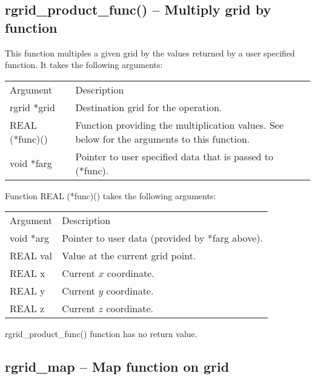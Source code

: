 \documentclass[12pt,letterpaper]{report}
\begin{document}
\subsection{rgrid\_product\_func() -- Multiply grid by function}

This function multiples a given grid by the values returned by a user specified function. It takes the following arguments:
\begin{longtable}{p{} p{}}
Argument & Description\\
\cline{1-2}
rgrid *grid & Destination grid for the operation.\\
REAL (*func)() & Function providing the multiplication values. See below for the arguments to this function.\\
void *farg & Pointer to user specified data that is passed to (*func).\\   
\end{longtable}
\noindent
Function REAL (*func)() takes the following arguments:
\begin{longtable}{p{} p{}}
Argument & Description\\
\cline{1-2}
void *arg & Pointer to user data (provided by *farg above).\\
REAL val & Value at the current grid point.\\
REAL x & Current $x$ coordinate.\\
REAL y & Current $y$ coordinate.\\
REAL z & Current $z$ coordinate.\\
\end{longtable}
\noindent
rgrid\_product\_func() function has no return value.

\subsection{rgrid\_map -- Map function on grid}
\end{document}
